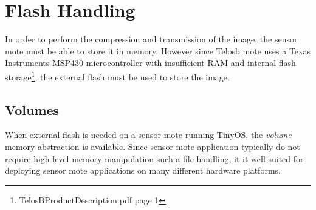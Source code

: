 \section{Flash Handling}

In order to perform the compression and transmission of the image, the sensor mote must be able to store it in memory. However since Telosb mote uses a Texas Instruments  MSP430 microcontroller with insufficient RAM and internal flash storage\footnote{TelosBProductDescription.pdf\cite{telosbProductDesc} page 1}, the external flash must be used to store the image.

\subsection{Volumes}
When external flash is needed on a sensor mote running TinyOS, the \emph{volume} memory abstraction is available. \cite{tinyOSprog} Since sensor mote application typically do not require high level memory manipulation such a file handling,  it it well suited for deploying sensor mote applications on many different hardware platforms.  

 

   